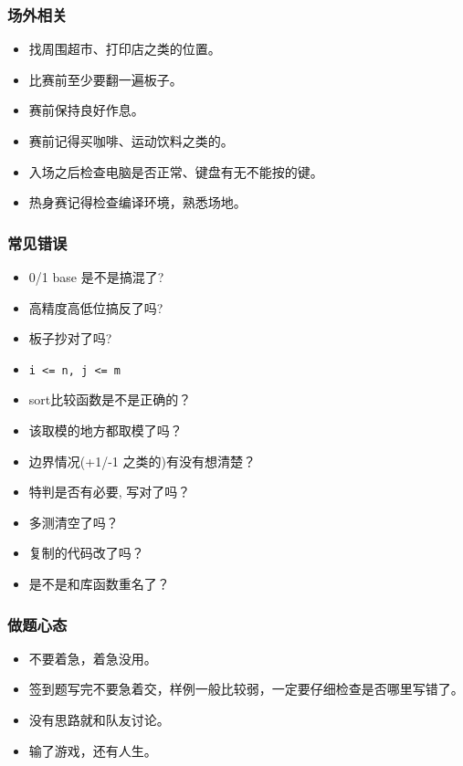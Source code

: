 \documentclass[a4paper, twoside]{article}
\begin{document}
    \subsubsection{场外相关}
    \begin{itemize}
        \item 找周围超市、打印店之类的位置。
        \item 比赛前至少要翻一遍板子。
        \item 赛前保持良好作息。
        \item 赛前记得买咖啡、运动饮料之类的。
        \item 入场之后检查电脑是否正常、键盘有无不能按的键。
        \item 热身赛记得检查编译环境，熟悉场地。
    \end{itemize}

    \subsubsection{常见错误}
    \begin{itemize}
        \item 0/1 base 是不是搞混了?
        \item 高精度高低位搞反了吗?
        \item 板子抄对了吗?
        \item \texttt{i <= n, j <= m}
        \item sort比较函数是不是正确的？
        \item 该取模的地方都取模了吗？
        \item 边界情况(+1/-1 之类的)有没有想清楚？
        \item 特判是否有必要, 写对了吗？
        \item 多测清空了吗？
        \item 复制的代码改了吗？
        \item 是不是和库函数重名了？
    \end{itemize}

    \subsubsection{做题心态}
    \begin{itemize}
        \item 不要着急，着急没用。
        \item 签到题写完不要急着交，样例一般比较弱，一定要仔细检查是否哪里写错了。
        \item 没有思路就和队友讨论。
        \item 输了游戏，还有人生。
    \end{itemize}
\end{document}
